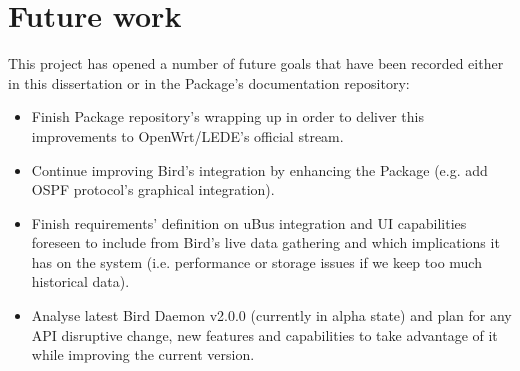 \section{Future work}
This project has opened a number of future goals that have been recorded either in this dissertation or in the Package's documentation repository:

\begin{itemize}
    \item Finish Package repository's wrapping up in order to deliver this improvements to OpenWrt/LEDE's official stream.
    \item Continue improving Bird's integration by enhancing the Package (e.g. add OSPF protocol's graphical integration).
    \item Finish requirements' definition on uBus integration and UI capabilities foreseen to include from Bird's live data gathering and which implications it has on the system (i.e. performance or storage issues if we keep too much historical data).
    \item Analyse latest Bird Daemon v2.0.0 (currently in alpha state) and plan for any API disruptive change, new features and capabilities to take advantage of it while improving the current version.
\end{itemize}











 

